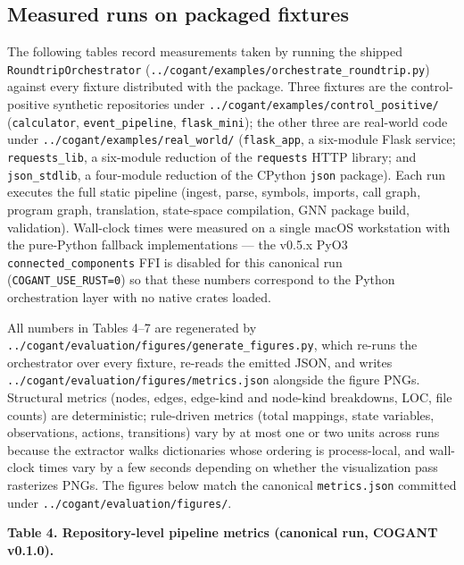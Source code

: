 \documentclass[
]{article}
\begin{document}
\subsection{Measured runs on packaged
fixtures}\label{measured-runs-on-packaged-fixtures-1}

The following tables record measurements taken by running the shipped
\texttt{RoundtripOrchestrator}
(\texttt{../cogant/examples/orchestrate\_roundtrip.py}) against every
fixture distributed with the package. Three fixtures are the
control-positive synthetic repositories under
\texttt{../cogant/examples/control\_positive/} (\texttt{calculator},
\texttt{event\_pipeline}, \texttt{flask\_mini}); the other three are
real-world code under \texttt{../cogant/examples/real\_world/}
(\texttt{flask\_app}, a six-module Flask service;
\texttt{requests\_lib}, a six-module reduction of the \texttt{requests}
HTTP library; and \texttt{json\_stdlib}, a four-module reduction of the
CPython \texttt{json} package). Each run executes the full static
pipeline (ingest, parse, symbols, imports, call graph, program graph,
translation, state-space compilation, GNN package build, validation).
Wall-clock times were measured on a single macOS workstation with the
pure-Python fallback implementations --- the v0.5.x PyO3
\texttt{connected\_components} FFI is disabled for this canonical run
(\texttt{COGANT\_USE\_RUST=0}) so that these numbers correspond to the
Python orchestration layer with no native crates loaded.

All numbers in Tables 4--7 are regenerated by
\texttt{../cogant/evaluation/figures/generate\_figures.py}, which
re-runs the orchestrator over every fixture, re-reads the emitted JSON,
and writes \texttt{../cogant/evaluation/figures/metrics.json} alongside
the figure PNGs. Structural metrics (nodes, edges, edge-kind and
node-kind breakdowns, LOC, file counts) are deterministic; rule-driven
metrics (total mappings, state variables, observations, actions,
transitions) vary by at most one or two units across runs because the
extractor walks dictionaries whose ordering is process-local, and
wall-clock times vary by a few seconds depending on whether the
visualization pass rasterizes PNGs. The figures below match the
canonical \texttt{metrics.json} committed under
\texttt{../cogant/evaluation/figures/}.

\textbf{Table 4. Repository-level pipeline metrics (canonical run,
COGANT v0.1.0).}
\end{document}
